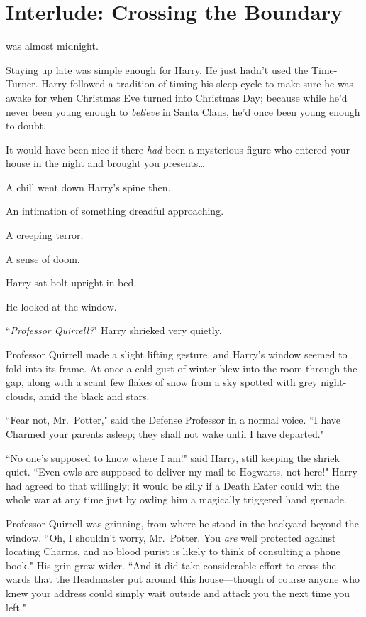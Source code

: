 \chapter{Interlude: Crossing the Boundary}

 was almost midnight.

\hplettrineextrapara
Staying up late was simple enough for Harry. He just hadn't used the Time-Turner. Harry followed a tradition of timing his sleep cycle to make sure he was awake for when Christmas Eve turned into Christmas Day; because while he'd never been young enough to \emph{believe} in Santa Claus, he'd once been young enough to doubt.

It would have been nice if there \emph{had} been a mysterious figure who entered your house in the night and brought you presents{\ldots}

A chill went down Harry's spine then.

An intimation of something dreadful approaching.

A creeping terror.

A sense of doom.

Harry sat bolt upright in bed.

He looked at the window.

``\emph{Professor Quirrell?}" Harry shrieked very quietly.

Professor Quirrell made a slight lifting gesture, and Harry's window seemed to fold into its frame. At once a cold gust of winter blew into the room through the gap, along with a scant few flakes of snow from a sky spotted with grey night-clouds, amid the black and stars.

``Fear not, Mr.~Potter," said the Defense Professor in a normal voice. ``I have Charmed your parents asleep; they shall not wake until I have departed."

``No one's supposed to know where I am!" said Harry, still keeping the shriek quiet. ``Even owls are supposed to deliver my mail to Hogwarts, not here!" Harry had agreed to that willingly; it would be silly if a Death Eater could win the whole war at any time just by owling him a magically triggered hand grenade.

Professor Quirrell was grinning, from where he stood in the backyard beyond the window. ``Oh, I shouldn't worry, Mr.~Potter. You \emph{are} well protected against locating Charms, and no blood purist is likely to think of consulting a phone book." His grin grew wider. ``And it did take considerable effort to cross the wards that the Headmaster put around this house—though of course anyone who knew your address could simply wait outside and attack you the next time you left."

